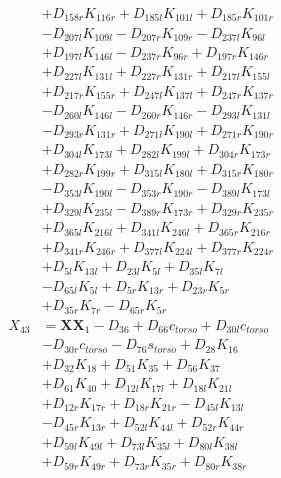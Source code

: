 \begin{multicols}{2}
\begin{align}
&+ D_{158r}K_{116r} + D_{185l}K_{101l} + D_{185r}K_{101r}  \nonumber \\
&- D_{207l}K_{109l} - D_{207r}K_{109r} - D_{237l}K_{96l}  \nonumber \\
&+ D_{197l}K_{146l} - D_{237r}K_{96r} + D_{197r}K_{146r}  \nonumber \\
&+ D_{227l}K_{131l} + D_{227r}K_{131r} + D_{217l}K_{155l}  \nonumber \\
&+ D_{217r}K_{155r} + D_{247l}K_{137l} + D_{247r}K_{137r}  \nonumber \\
&- D_{260l}K_{146l} - D_{260r}K_{146r} - D_{293l}K_{131l}  \nonumber \\
&- D_{293r}K_{131r} + D_{271l}K_{190l} + D_{271r}K_{190r}  \nonumber \\
&+ D_{304l}K_{173l} + D_{282l}K_{199l} + D_{304r}K_{173r}  \nonumber \\
&+ D_{282r}K_{199r} + D_{315l}K_{180l} + D_{315r}K_{180r}  \nonumber \\
&- D_{353l}K_{190l} - D_{353r}K_{190r} - D_{389l}K_{173l}  \nonumber \\
&+ D_{329l}K_{235l} - D_{389r}K_{173r} + D_{329r}K_{235r}  \nonumber \\
&+ D_{365l}K_{216l} + D_{341l}K_{246l} + D_{365r}K_{216r}  \nonumber \\
&+ D_{341r}K_{246r} + D_{377l}K_{224l} + D_{377r}K_{224r}  \nonumber \\
&+ D_{5l}K_{13l} + D_{23l}K_{5l} + D_{35l}K_{7l}  \nonumber \\
&- D_{65l}K_{5l} + D_{5r}K_{13r} + D_{23r}K_{5r}  \nonumber \\
&+ D_{35r}K_{7r} - D_{65r}K_{5r} \nonumber \\
X_{43} &= \mathbf{XX}_1 - D_{36} + D_{66}c_{torso} + D_{30l}c_{torso}  \nonumber \\
&- D_{30r}c_{torso} - D_{76}s_{torso} + D_{28}K_{16}  \nonumber \\
&+ D_{32}K_{18} + D_{51}K_{35} + D_{56}K_{37}  \nonumber \\
&+ D_{61}K_{40} + D_{12l}K_{17l} + D_{18l}K_{21l}  \nonumber \\
&+ D_{12r}K_{17r} + D_{18r}K_{21r} - D_{45l}K_{13l}  \nonumber \\
&- D_{45r}K_{13r} + D_{52l}K_{44l} + D_{52r}K_{44r}  \nonumber \\
&+ D_{59l}K_{49l} + D_{73l}K_{35l} + D_{80l}K_{38l}  \nonumber \\
&+ D_{59r}K_{49r} + D_{73r}K_{35r} + D_{80r}K_{38r}  \nonumber \\

\end{align}
\end{multicols}
